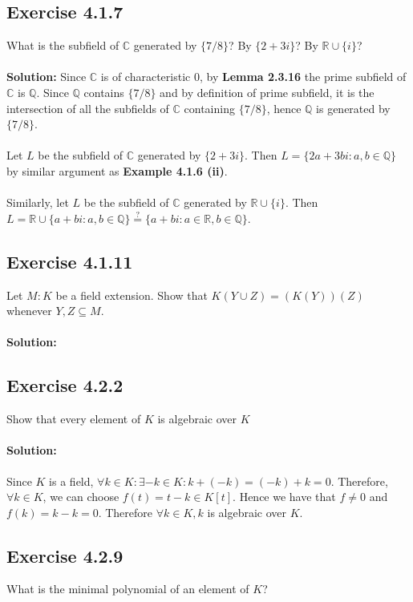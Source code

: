 \documentclass{article}
\begin{document}
\subsection*{Exercise 4.1.7}
What is the subfield of $\mathbb{C}$ generated by $\{7/8\}$? By $\{2+3i\}$? By $\mathbb{R}\cup\{i\}$?
\\\\
\textbf{Solution:}
Since $\mathbb{C}$ is of characteristic $0$, by \textbf{Lemma 2.3.16} the prime subfield of $\mathbb{C}$ is $\mathbb{Q}$.
Since $\mathbb{Q}$ contains $\{7/8\}$ and by definition of prime subfield, it is the intersection of all the subfields of $\mathbb{C}$ containing $\{7/8\}$, 
hence $\mathbb{Q}$ is generated by $\{7/8\}$.\\\\
Let $L$ be the subfield of $\mathbb{C}$ generated by $\{2+3i\}$. Then $L = \{2a+3bi: a,b \in \mathbb{Q}\}$ by similar argument as \textbf{Example 4.1.6 (ii)}.\\\\
Similarly, let $L$ be the subfield of $\mathbb{C}$ generated by $ \mathbb{R}\cup\{i\}$. Then \\ $L=\mathbb{R} \cup \{a+bi: a,b \in \mathbb{Q}\} \stackrel{?}{=} \{a+bi: a \in \mathbb{R}, b \in \mathbb{Q}\}$.

\subsection*{Exercise 4.1.11}
Let $M:K$ be a field extension. Show that $K(Y \cup Z) = (K(Y))(Z)$ whenever $Y,Z \subseteq M$. 
\\\\
\textbf{Solution:}

\subsection*{Exercise 4.2.2}
Show that every element of $K$ is algebraic over $K$
\paragraph{Solution:}
Since $K$ is a field, $\forall k \in K: \exists -k \in K: k + (-k) = (-k) + k = 0$.
Therefore, $\forall k \in K$, we can choose $f(t) = t - k \in K[t]$. Hence we have that $f \neq 0$
and $f(k) = k - k = 0$. Therefore $\forall k \in K, k$ is algebraic over $K$.


\subsection*{Exercise 4.2.9}
What is the minimal polynomial of an element of $K$?
\end{document}
